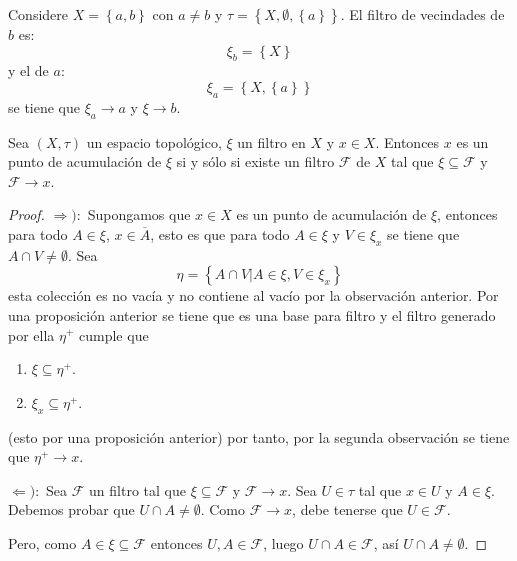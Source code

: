 \documentclass[12pt]{report}
\theoremstyle{largebreak}
\newcommand{\Cls}[1]{\ensuremath{\overline{#1}}}
\begin{document}
    \begin{exa}
        Considere $X=\left\{a,b \right\}$ con $a\neq b$ y $\tau=\left\{X,\emptyset,\left\{a\right\} \right\}$. El filtro de vecindades de $b$ es:
        \begin{equation*}
            \xi_b=\left\{X\right\}
        \end{equation*}
        y el de $a$:
        \begin{equation*}
            \xi_a=\left\{X,\left\{a\right\} \right\}
        \end{equation*}
        se tiene que $\xi_a\rightarrow a$ y $\xi\rightarrow b$.
    \end{exa}

    \begin{propo}
        Sea $(X,\tau)$ un espacio topológico, $\xi$ un filtro en $X$ y $x\in X$. Entonces $x$ es un punto de acumulación de $\xi$ si y sólo si existe un filtro $\mathcal{F}$ de $X$ tal que $\xi\subseteq\mathcal{F}$ y $\mathcal{F}\rightarrow x$.
    \end{propo}

    \begin{proof}
        $\Rightarrow):$ Supongamos que $x\in X$ es un punto de acumulación de $\xi$, entonces para todo $A\in\xi$, $x\in\Cls{A}$, esto es que para todo $A\in\xi$ y $V\in\xi_x$ se tiene que $A\cap V\neq\emptyset$. Sea
        \begin{equation*}
            \eta=\left\{A\cap V\Big|A\in\xi,V\in\xi_x \right\}
        \end{equation*}
        esta colección es no vacía y no contiene al vacío por la observación anterior. Por una proposición anterior se tiene que es una base para filtro y el filtro generado por ella $\eta^+$ cumple que
        \begin{enumerate}
            \item $\xi\subseteq\eta^+$.
            \item $\xi_x\subseteq\eta^+$.
        \end{enumerate}
        (esto por una proposición anterior) por tanto, por la segunda observación se tiene que $\eta^+\rightarrow x$.

        $\Leftarrow):$ Sea $\mathcal{F}$ un filtro tal que $\xi\subseteq\mathcal{F}$ y $\mathcal{F}\rightarrow x$. Sea $U\in\tau$ tal que $x\in U$ y $A\in\xi$. Debemos probar que $U\cap A\neq\emptyset$. Como $\mathcal{F}\rightarrow x$, debe tenerse que $U\in\mathcal{F}$.

        Pero, como $A\in\xi\subseteq\mathcal{F}$ entonces $U,A\in\mathcal{F}$, luego $U\cap A\in\mathcal{F}$, así $U\cap A\neq\emptyset$.
    \end{proof}
\end{document}
